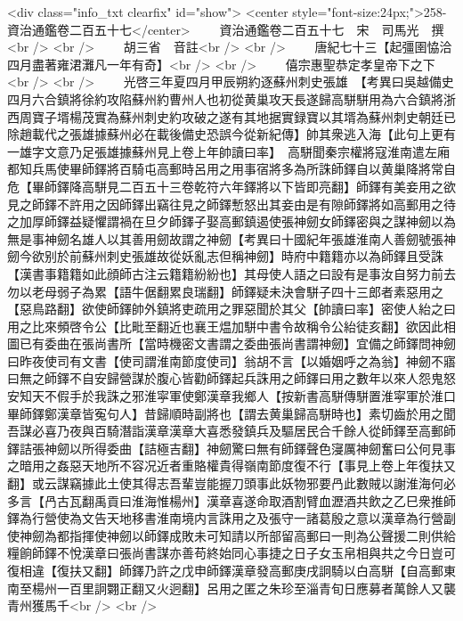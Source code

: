<div class="info_txt clearfix" id="show">
<center style="font-size:24px;">258-資治通鑑卷二百五十七</center>
  　　資治通鑑卷二百五十七　宋　司馬光　撰<br />
<br />
　　胡三省　音註<br />
<br />
　　唐紀七十三【起彊圉恊洽四月盡著雍涒灘凡一年有奇】<br />
<br />
　　僖宗惠聖恭定孝皇帝下之下<br />
<br />
　　光啓三年夏四月甲辰朔約逐蘇州刺史張雄　【考異曰吳越備史四月六合鎮將徐約攻陷蘇州約曹州人也初從黄巢攻天長遂歸高駢駢用為六合鎮將浙西周寶子壻楊茂實為蘇州刺史約攻破之遂有其地据實録寶以其壻為蘇州刺史朝廷已除趙載代之張雄據蘇州必在載後備史恐誤今從新紀傳】帥其衆逃入海【此句上更有一雄字文意乃足張雄據蘇州見上卷上年帥讀曰率】　高駢聞秦宗權將寇淮南遣左廂都知兵馬使畢師鐸將百騎屯高郵時呂用之用事宿將多為所誅師鐸自以黄巢降將常自危【畢師鐸降高駢見二百五十三卷乾符六年鐸將以下皆即亮翻】師鐸有美妾用之欲見之師鐸不許用之因師鐸出竊往見之師鐸慙怒出其妾由是有隙師鐸將如高郵用之待之加厚師鐸益疑懼謂禍在旦夕師鐸子娶高郵鎮遏使張神劒女師鐸密與之謀神劒以為無是事神劒名雄人以其善用劒故謂之神劒【考異曰十國紀年張雄淮南人善劒號張神劒今欲别於前蘇州刺史張雄故從妖亂志但稱神劒】時府中籍籍亦以為師鐸且受誅【漢書事籍籍如此顔師古注云籍籍紛紛也】其母使人語之曰設有是事汝自努力前去勿以老母弱子為累【語牛倨翻累良瑞翻】師鐸疑未決會駢子四十三郎者素惡用之【惡鳥路翻】欲使師鐸帥外鎮將吏疏用之罪惡聞於其父【帥讀曰率】密使人紿之曰用之比來頻啓令公【比毗至翻近也襄王煴加駢中書令故稱令公紿徒亥翻】欲因此相圖已有委曲在張尚書所【當時機密文書謂之委曲張尚書謂神劒】宜備之師鐸問神劒曰昨夜使司有文書【使司謂淮南節度使司】翁胡不言【以婚姻呼之為翁】神劒不寤曰無之師鐸不自安歸營謀於腹心皆勸師鐸起兵誅用之師鐸曰用之數年以來人怨鬼怒安知天不假手於我誅之邪淮寜軍使鄭漢章我鄉人【按新書高駢傳駢置淮寜軍於淮口畢師鐸鄭漢章皆寃句人】昔歸順時副將也【謂去黄巢歸高駢時也】素切齒於用之聞吾謀必喜乃夜與百騎潛詣漢章漢章大喜悉發鎮兵及驅居民合千餘人從師鐸至高郵師鐸詰張神劒以所得委曲【詰極吉翻】神劒驚曰無有師鐸聲色寖厲神劒奮曰公何見事之暗用之姦惡天地所不容况近者重賂權貴得嶺南節度復不行【事見上卷上年復扶又翻】或云謀竊據此土使其得志吾輩豈能握刀頭事此妖物邪要冎此數賊以謝淮海何必多言【冎古瓦翻禹貢曰淮海惟楊州】漢章喜遂命取酒割臂血瀝酒共飲之乙巳衆推師鐸為行營使為文告天地移書淮南境内言誅用之及張守一諸葛殷之意以漢章為行營副使神劒為都指揮使神劒以師鐸成敗未可知請以所部留高郵曰一則為公聲援二則供給糧餉師鐸不悅漢章曰張尚書謀亦善苟終始同心事捷之日子女玉帛相與共之今日豈可復相違【復扶又翻】師鐸乃許之戊申師鐸漢章發高郵庚戌詗騎以白高駢【自高郵東南至楊州一百里詗翾正翻又火迥翻】呂用之匿之朱珍至淄青旬日應募者萬餘人又襲青州獲馬千<br />
<br />
